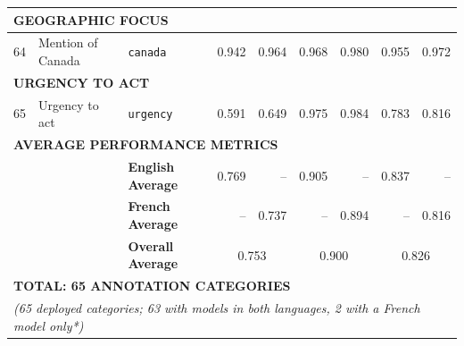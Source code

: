 \begin{longtable}{p{0.4cm}p{4.0cm}p{3.0cm}rrrrrr}
\midrule
\multicolumn{9}{l}{\cellcolor{gray!10}\textbf{GEOGRAPHIC FOCUS}} \\
\midrule
64 & Mention of Canada & \texttt{canada} & 0.942 & 0.964 & 0.968 & 0.980 & 0.955 & 0.972 \\
\midrule
\multicolumn{9}{l}{\cellcolor{gray!10}\textbf{URGENCY TO ACT}} \\
\midrule
65 & Urgency to act & \texttt{urgency} & 0.591 & 0.649 & 0.975 & 0.984 & 0.783 & 0.816 \\
\multicolumn{9}{l}{\cellcolor{gray!20}\textbf{AVERAGE PERFORMANCE METRICS}} \\
& & \textbf{English Average} & 0.769 & -- & 0.905 & -- & 0.837 & -- \\
& & \textbf{French Average} & -- & 0.737 & -- & 0.894 & -- & 0.816 \\
& & \textbf{Overall Average} & \multicolumn{2}{c}{0.753} & \multicolumn{2}{c}{0.900} & \multicolumn{2}{c}{0.826} \\
\midrule
\multicolumn{9}{l}{\cellcolor{gray!20}\textbf{TOTAL: 65 ANNOTATION CATEGORIES}} \\
\multicolumn{9}{l}{\cellcolor{gray!20}\textit{(65 deployed categories; 63 with models in both languages, 2 with a French model only*)}} \\
\end{longtable}